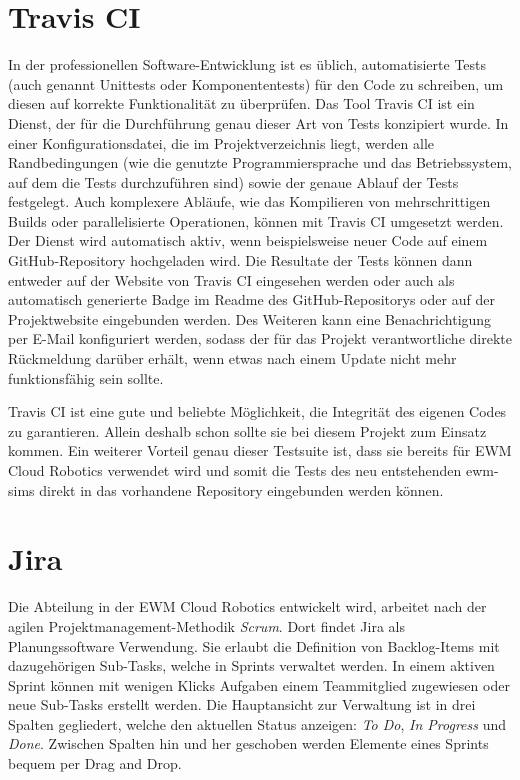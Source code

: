 \section{Travis CI}
\label{sec:travis-desc}
In der professionellen Software-Entwicklung ist es üblich, automatisierte Tests (auch genannt Unittests oder Komponententests) für den Code zu schreiben, um diesen auf korrekte Funktionalität zu überprüfen.
Das Tool Travis CI ist ein Dienst, der für die Durchführung genau dieser Art von Tests konzipiert wurde.
In einer Konfigurationsdatei, die im Projektverzeichnis liegt, werden alle Randbedingungen (wie die genutzte Programmiersprache und das Betriebssystem, auf dem die Tests durchzuführen sind) sowie der genaue Ablauf der Tests festgelegt.
Auch komplexere Abläufe, wie das Kompilieren von mehrschrittigen Builds oder parallelisierte Operationen, können mit Travis CI umgesetzt werden.
Der Dienst wird automatisch aktiv, wenn beispielsweise neuer Code auf einem GitHub-Repository hochgeladen wird.
Die Resultate der Tests können dann entweder auf der Website von Travis CI eingesehen werden oder auch als automatisch generierte Badge im Readme des GitHub-Repositorys oder auf der Projektwebsite eingebunden werden.
Des Weiteren kann eine Benachrichtigung per E-Mail konfiguriert werden, sodass der für das Projekt verantwortliche direkte Rückmeldung darüber erhält, wenn etwas nach einem Update nicht mehr funktionsfähig sein sollte.~\cite{travis}

Travis CI ist eine gute und beliebte Möglichkeit, die Integrität des eigenen Codes zu garantieren.
Allein deshalb schon sollte sie bei diesem Projekt zum Einsatz kommen.
Ein weiterer Vorteil genau dieser Testsuite ist, dass sie bereits für \ac{EWM} Cloud Robotics verwendet wird und somit die Tests des neu entstehenden \ac{ewm-sim}s direkt in das vorhandene Repository eingebunden werden können.

\section{Jira}
Die Abteilung in der \ac{EWM} Cloud Robotics entwickelt wird, arbeitet nach der agilen Projektmanagement-Methodik \emph{Scrum}.
Dort findet Jira als Planungssoftware Verwendung.
Sie erlaubt die Definition von Backlog-Items mit dazugehörigen Sub-Tasks, welche in Sprints verwaltet werden.
In einem aktiven Sprint können mit wenigen Klicks Aufgaben einem Teammitglied zugewiesen oder neue Sub-Tasks erstellt werden.
Die Hauptansicht zur Verwaltung ist in drei Spalten gegliedert, welche den aktuellen Status anzeigen: \emph{To Do}, \emph{In Progress} und \emph{Done}.
Zwischen Spalten hin und her geschoben werden Elemente eines Sprints bequem per Drag and Drop.~\cite{jira}